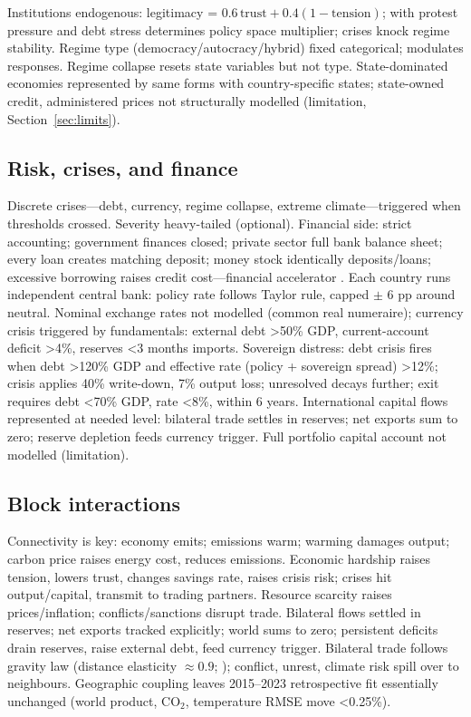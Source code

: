 \documentclass[a4paper,fleqn]{cas-sc}
\begin{document}
Institutions endogenous: legitimacy = $0.6\,\text{trust} + 0.4(1-\text{tension})$; with protest pressure and debt stress determines policy space multiplier; crises knock regime stability. Regime type (democracy/autocracy/hybrid) fixed categorical; modulates responses. Regime collapse resets state variables but not type. State-dominated economies represented by same forms with country-specific states; state-owned credit, administered prices not structurally modelled (limitation, Section~\ref{sec:limits}).

\subsection{Risk, crises, and finance}

Discrete crises---debt, currency, regime collapse, extreme climate---triggered when thresholds crossed. Severity heavy-tailed (optional). Financial side: strict accounting; government finances closed; private sector full bank balance sheet; every loan creates matching deposit; money stock identically deposits/loans; excessive borrowing raises credit cost---financial accelerator \citep{bernanke1999,godley2007}. Each country runs independent central bank: policy rate follows Taylor rule, capped $\pm{}$ 6 pp around neutral. Nominal exchange rates not modelled (common real numeraire); currency crisis triggered by fundamentals: external debt >50\% GDP, current-account deficit >4\%, reserves <3 months imports. Sovereign distress: debt crisis fires when debt >120\% GDP and effective rate (policy + sovereign spread) >12\%; crisis applies 40\% write-down, 7\% output loss; unresolved decays further; exit requires debt <70\% GDP, rate <8\%, within 6 years. International capital flows represented at needed level: bilateral trade settles in reserves; net exports sum to zero; reserve depletion feeds currency trigger. Full portfolio capital account not modelled (limitation).

\subsection{Block interactions}

Connectivity is key: economy emits; emissions warm; warming damages output; carbon price raises energy cost, reduces emissions. Economic hardship raises tension, lowers trust, changes savings rate, raises crisis risk; crises hit output/capital, transmit to trading partners. Resource scarcity raises prices/inflation; conflicts/sanctions disrupt trade. Bilateral flows settled in reserves; net exports tracked explicitly; world sums to zero; persistent deficits drain reserves, raise external debt, feed currency trigger. Bilateral trade follows gravity law (distance elasticity ${\approx}0.9$; \citealp{headmayer2014}); conflict, unrest, climate risk spill over to neighbours. Geographic coupling leaves 2015--2023 retrospective fit essentially unchanged (world product, CO${}_2$, temperature RMSE move <0.25\%).
\end{document}
